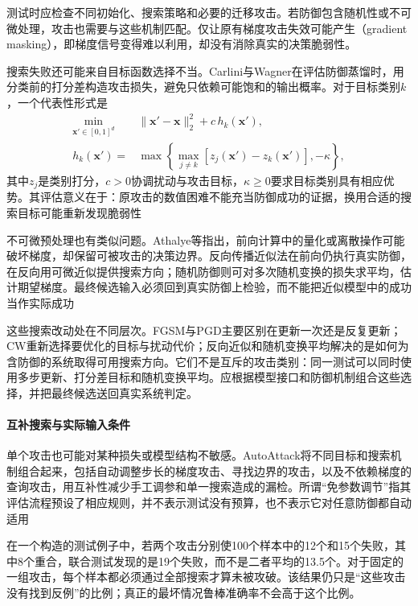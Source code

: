 测试时应检查不同初始化、搜索策略和必要的迁移攻击。若防御包含随机性或不可微处理，攻击也需要与这些机制匹配。仅让原有梯度攻击失效可能产生（gradient masking），即梯度信号变得难以利用，却没有消除真实的决策脆弱性。

搜索失败还可能来自目标函数选择不当。Carlini与Wagner在评估防御蒸馏时，用分类前的打分差构造攻击损失，避免只依赖可能饱和的输出概率。对于目标类别$k$，一个代表性形式是
\begin{equation}
 \begin{aligned}
 \min_{\bm{x}'\in[0,1]^d}\quad&
 \|\bm{x}'-\bm{x}\|_2^2+c\,h_k(\bm{x}'),\\
 h_k(\bm{x}')={}&
 \max\left\{\max_{j\ne k}
 [z_j(\bm{x}')-z_k(\bm{x}')],-\kappa\right\},
 \end{aligned}
 \label{eq:security-cw}
\end{equation}
其中$z_j$是类别打分，$c>0$协调扰动与攻击目标，$\kappa\geq0$要求目标类别具有相应优势。其评估意义在于：原攻击的数值困难不能充当防御成功的证据，换用合适的搜索目标可能重新发现脆弱性

不可微预处理也有类似问题。Athalye等指出，前向计算中的量化或离散操作可能破坏梯度，却保留可被攻击的决策边界。反向传播近似法在前向仍执行真实防御，在反向用可微近似提供搜索方向；随机防御则可对多次随机变换的损失求平均，估计期望梯度。最终候选输入必须回到真实防御上检验，而不能把近似模型中的成功当作实际成功

这些搜索改动处在不同层次。FGSM与PGD主要区别在更新一次还是反复更新；CW重新选择要优化的目标与扰动代价；反向近似和随机变换平均解决的是如何为含防御的系统取得可用搜索方向。它们不是互斥的攻击类别：同一测试可以同时使用多步更新、打分差目标和随机变换平均。应根据模型接口和防御机制组合这些选择，并把最终候选送回真实系统判定。

\paragraph{互补搜索与实际输入条件}

单个攻击也可能对某种损失或模型结构不敏感。AutoAttack将不同目标和搜索机制组合起来，包括自动调整步长的梯度攻击、寻找边界的攻击，以及不依赖梯度的查询攻击，用互补性减少手工调参和单一搜索造成的漏检。所谓“免参数调节”指其评估流程预设了相应规则，并不表示测试没有预算，也不表示它对任意防御都自动适用

在一个构造的测试例子中，若两个攻击分别使100个样本中的12个和15个失败，其中8个重合，联合测试发现的是19个失败，而不是二者平均的13.5个。对于固定的一组攻击，每个样本都必须通过全部搜索才算未被攻破。该结果仍只是“这些攻击没有找到反例”的比例；真正的最坏情况鲁棒准确率不会高于这个比例。

